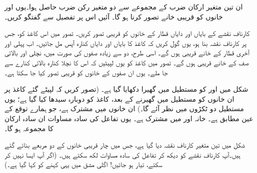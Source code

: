 ان تین متغیر ارکان ضرب کے مجموعے سے دو متغیر رکن ضرب حاصل ہوا۔یوں  اور  خانوں کو قریبی خانے تصور کرنا ہو گا۔ آئیں اس پر تفصیل سے گفتگو کریں۔

کارناف نقشے کے بایاں اور دایاں قطار کے خانوں کو قریبی تصور کریں۔ تصور میں اس کاغذ کو، جس پر کارناف نقشہ بنا ہو، یوں گول کریں کہ کاغذ کا بایاں اور دایاں کنارہ آپس مل جائیں۔ اب پہلی اور آخری قطار کے خانے قریبی ہوں گے۔ اسی طرح، دو سے زیادہ صفوں کی صورت میں، نچلی اور بالائی صف کے خانے قریبی ہوں گے۔ تصور میں کاغذ کو یوں لپیٹیں کہ اس کا نچلا کنارہ بالائی کنارے سے جا ملے۔ یوں ان صفوں کے خانوں کو قریبی تصور کیا جا سکتا ہے۔ 
	
شکل  میں  اور  کو مستطیل میں گھیرا دکھایا گیا ہے۔ (تصور کریں کہ لپیٹے گئے کاغذ پر ان خانوں کو مستطیل میں گھیرنے کے بعد، کاغذ کو دوبارہ سیدھا کیا گیا ہے؛ یوں مستطیل دو ٹکڑوں میں نظر آئے گا۔) ان خانوں میں  مشترک ہے، جو ہمارے توقع کے عین مطابق ہے۔ خانہ  اور  میں  مشترک ہے۔ یوں تفاعل کی سادہ مساوات ان سادہ ارکان کا مجموعہ  ہو گا۔


شکل  میں تین متغیر کارناف نقشہ دیا گیا ہے، جس میں چار قریبی خانوں کے دو مربعے بنائے گئے ہیں۔آپ کارناف نقشے کو دیکھ کر تفاعل کی سادہ مساوات لکھ سکتے ہیں۔ (اگر آپ ایسا نہیں کر سکتے، تیار ہو جائیں! اگلی مشق میں یہی کہنے کو کہا گیا ہے۔)

